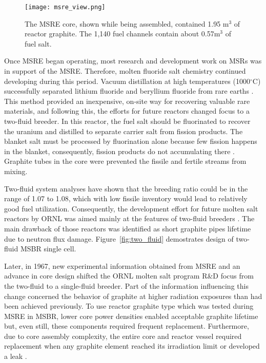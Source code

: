 \begin{figure}[htp!] %
  \centering
  \vspace{-0.3em}
  \texttt{[image: msre\_view.png]}
  \caption{The \gls{MSRE} core, shown while being assembled, contained 1.95 m$^3$ of reactor graphite. The 1,140 fuel channels contain about 0.57m$^3$ of fuel salt.}
  \vspace{-0.6em}
  \label{fig:msre}
\end{figure}
\FloatBarrier

Once \gls{MSRE} began operating, most research and development work on \glspl{MSR} was in support of the \gls{MSRE}. Therefore, molten fluoride salt chemistry continued developing during this period. Vacuum distillation at high temperatures (1000$^{\circ}$C) successfully separated lithium fluoride and beryllium fluoride from rare earths \cite{kelly_removal_1965}. This method provided an inexpensive, on-site way for recovering valuable rare materials, and following this, the efforts for future reactors changed focus to a two-fluid breeder. In this reactor, the fuel salt should be fluorinated to recover the uranium and distilled to separate carrier salt from fission products. The blanket salt must be processed by fluorination alone because few fission happens in the blanket, consequently, fission products do not accumulating there \cite{rosenthal_molten-salt_1970}. Graphite tubes in the core were prevented the fissile and fertile streams from mixing.

Two-fluid system analyses have shown that the breeding ratio could be in the range of 1.07 to 1.08, which with low fissile inventory would lead to relatively good fuel utilization. Consequently, the development effort for future molten salt reactors by \gls{ORNL} was aimed mainly at the features of two-fluid breeders \cite{briggs_summary_1967}. The main drawback of those reactors was identified as short graphite pipes lifetime due to neutron flux damage. Figure~\ref{fig:two_fluid} demostrates design of two-fluid \gls{MSBR} single cell.

Later, in 1967, new experimental information obtained from \gls{MSRE} and an advance in core design shifted the \gls{ORNL} molten salt program R\&D focus from the two-fluid to a single-fluid breeder. Part of the information influencing this change concerned the behavior of graphite at higher radiation exposures than had been achieved previously. To use reactor graphite type which was tested during \gls{MSRE} in \gls{MSBR}, lower core power densities enabled acceptable graphite lifetime but, even still, these components required frequent replacement. Furthermore, due to core assembly complexity, the entire core and reactor vessel required replacement when any graphite element reached its irradiation limit or developed a leak \cite{rosenthal_molten-salt_1970}.

